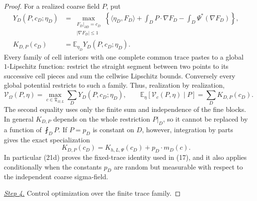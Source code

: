 \documentclass{smfart}
\theoremstyle{definition}
\newcommand{\1}{\mathbf 1}
\begin{document}
\begin{proof}
For a realized coarse field $P$, put
\begin{equation*}
\begin{aligned}
Y_ D(P,c_ D;\eta_ D)&=
\max_ {\substack{F_ D|_ {\partial D}=c_ D\\|\nabla F_ D|\leq1}}
\left\{\langle\eta_ D,F_ D\rangle+
\int_ DP\cdot\nabla F_ D-\int_ D\Psi^*(\nabla F_ D)\right\},\\
K_ {D,P}(c_ D)&=\mathbb E_ {\eta_ D}Y_ D(P,c_ D;\eta_ D).
\end{aligned}
\end{equation*}
Every family of cell interiors with one complete common trace pastes to
a global $1$-Lipschitz function: restrict the straight segment between
two points to its successive cell pieces and sum the cellwise Lipschitz
bounds.  Conversely every global potential restricts to such a family.
Thus, realization by realization,
\begin{equation}
\mathcal V_ \Omega(P,\eta)
=\max_ {c\in\mathfrak T_ {\Omega,L}}\sum_ DY_ D(P,c_ D;\eta_ D),
\qquad
\mathbb E_ \eta[\mathcal V_ c(P,\eta)\mid P]
=\sum_ DK_ {D,P}(c_ D).
\tag{21c}
\end{equation}
The second equality uses only the finite sum and independence of the
fine blocks.  In general $K_ {D,P}$ depends on the whole restriction
$P|_ D$, so it cannot be replaced by a function of $\fint_ DP$.
If $P=p_ D$ is constant on $D$, however, integration by parts gives
the exact specialization
\begin{equation}
K_ {D,P}(c_ D)=K_ {h,L,\Psi}(c_ D)+p_ D\cdot m_ D(c).
\tag{21d}
\end{equation}
In particular (21d) proves the fixed-trace identity used in (17), and
it also applies conditionally when the constants $p_ D$ are random but
measurable with respect to the independent coarse sigma-field.

\smallskip\noindent
\underline{\textit{Step 4.}} Control optimization over the finite trace family.


\end{proof}
\end{document}
